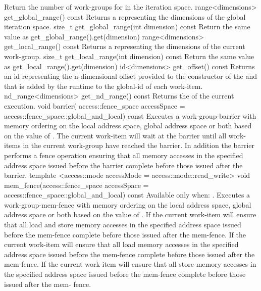     {
    Return the number of \glspl{work-group} for  in the
    iteration space.
    }
  \addRow
    {range<dimensions> get_global_range() const}
    {
        Returns a  representing the dimensions of the
        global iteration space.
    }
  \addRow
    {size_t get_global_range(int dimension) const}
    {
      Return the same value as get_global_range().get(dimension)
    }
  \addRow
    {range<dimensions> get_local_range() const}
    {
        Returns a  representing the dimensions of the current
        work-group.
    }
  \addRow
    {size_t get_local_range(int dimension) const}
    {
      Return the same value as get_local_range().get(dimension)
    }
  \addRow
    {id<dimensions> get_offset() const}
    {
        Returns an \gls{id} representing the n-dimensional offset
        provided to the constructor of the  and that
        is added by the runtime to the \gls{global-id} of each \gls{work-item}.
    }
  \addRow
    {nd_range<dimensions> get_nd_range() const}
    {
        Returns the  of the current execution.
    }
  \addRowThreeL
    {void barrier(}
    {access::fence_space accessSpace =}
    {access::fence_space::global_and_local) const}
    {
      Executes a \gls{work-group-barrier} with memory ordering on the local address
      space, global address space or both based on the value of
      . The current work-item will wait at the
      barrier until all work-items in the current work-group have
      reached the barrier. In addition the barrier performs a fence
      operation ensuring that all memory accesses in the specified
      address space issued before the barrier complete before those
      issued after the barrier.
    }
  \addRowFourL
    { template <access::mode accessMode = }
    { access::mode::read_write> }
    { void mem_fence(access::fence_space accessSpace = }
    { access::fence_space::global_and_local) const }
    {
      Available only when: .
      \newline
      Executes a \gls{work-group-mem-fence} with memory ordering on the local
      address space, global address space or both based on the value of
      . If  the current work-item will ensure that all load
      and store memory accesses in the specified address space issued before the
      mem-fence complete before those issued after the mem-fence. If
       the current work-item will
      ensure that all load memory accesses in the specified address space issued
      before the mem-fence complete before those issued after the mem-fence. If
       the current work-item will
      ensure that all store memory accesses in the specified address space
      issued before the mem-fence complete before those issued after the mem-
      fence.
    }
